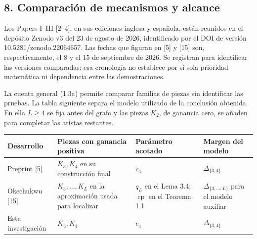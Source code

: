 \documentclass[spanish,11pt,a4paper]{article}
\newcounter{none}
\begin{document}
\subsection{8. Comparación de mecanismos y alcance}\label{comparacion-de-mecanismos-y-alcance}

Los Papers I--III {[}2--4{]}, en sus ediciones inglesa y española, están reunidos en el depósito Zenodo v3 del 23 de agosto de 2026, identificado por el DOI de versión {\ttfamily\small 10.\discretionary{\hbox{\ensuremath{\hookrightarrow}}}{}{}5281/\discretionary{\hbox{\ensuremath{\hookrightarrow}}}{}{}zenodo.\discretionary{\hbox{\ensuremath{\hookrightarrow}}}{}{}22064657}. Las fechas que figuran en {[}5{]} y {[}15{]} son, respectivamente, el 8 y el 15 de septiembre de 2026. Se registran para identificar las versiones comparadas; esa cronología no establece por sí sola prioridad matemática ni dependencia entre las demostraciones.

La cuenta general (1.3a) permite comparar familias de piezas sin identificar las pruebas. La tabla siguiente separa el modelo utilizado de la conclusión obtenida. En ella \(L\ge4\) se fija antes del grafo y las piezas \(K_2\), de ganancia cero, se añaden para completar las aristas restantes.


{\def\LTcaptype{none} %
\begin{longtable}[c]{@{}
  >{\raggedright\arraybackslash}p{}
  >{\raggedright\arraybackslash}p{}
  >{\raggedright\arraybackslash}p{}
  >{\raggedright\arraybackslash}p{}@{}}
\toprule\noalign{}
\begin{minipage}[b]{\linewidth}\raggedright
Desarrollo
\end{minipage} & \begin{minipage}[b]{\linewidth}\raggedright
Piezas con ganancia positiva
\end{minipage} & \begin{minipage}[b]{\linewidth}\raggedright
Parámetro acotado
\end{minipage} & \begin{minipage}[b]{\linewidth}\raggedright
Margen del modelo
\end{minipage} \\
\midrule\noalign{}
\endhead
\bottomrule\noalign{}
\endlastfoot
Preprint {[}5{]} & \(K_3,K_4\) en su construcción final & \(c_4\) & \(\Delta_{\{3,4\}}\) \\
Okechukwu {[}15{]} & \(K_3,\ldots,K_L\) en la aproximación usada para localizar & \(q_L\) en el Lema 3.4; \(\operatorname{cp}\) en el Teorema 1.1 & \(\Delta_{\{3,\ldots,L\}}\) para el modelo auxiliar \\
Esta investigación & \(K_3,K_4\) & \(c_4\) & \(\Delta_{\{3,4\}}\) \\
\end{longtable}
}
\end{document}
